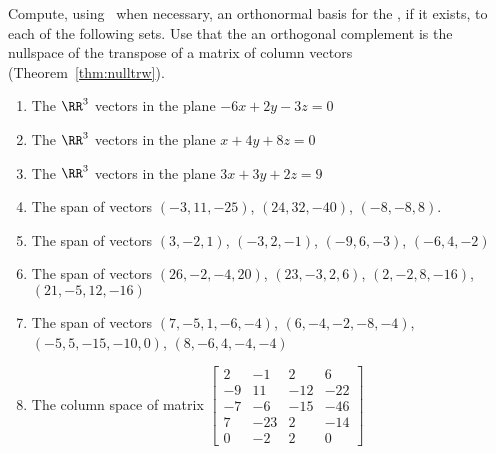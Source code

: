 \begin{exercise} \label{ex:} 
Compute, using \script\ when necessary, an orthonormal basis for the , if it exists, to each of the following sets.
Use that the an orthogonal complement is the nullspace of the transpose of a matrix of column vectors (Theorem~\ref{thm:nulltrw}).

\sloppy%
\begin{enumerate}
\item The \(\RR^3\) vectors in the plane \(-6x+2y-3z=0\)

\item The \(\RR^3\) vectors in the plane \(x+4y+8z=0\)

\item The \(\RR^3\) vectors in the plane \(3x+3y+2z=9\)


\item The span of vectors \((-3,11,-25)\), \((24,32,-40)\), \((-8,-8,8)\).

\item The span of vectors \((3,-2,1)\), \((-3,2,-1)\), \((-9,6,-3)\), \((-6,4,-2)\)

\item The span of vectors \((26,-2,-4,20)\), \((23,-3,2,6)\), \((2,-2,8,-16)\), \((21,-5,12,-16)\)

\item The span of vectors \((7,-5,1,-6,-4)\), \((6,-4,-2,-8,-4)\), \((-5,5,-15,-10,0)\), \((8,-6,4,-4,-4)\)

\item The column space of matrix
\(\begin{bmatrix} 2&-1&2&6
\\-9&11&-12&-22
\\-7&-6&-15&-46
\\7&-23&2&-14
\\0&-2&2&0 \end{bmatrix}\)



\end{enumerate}
\end{exercise}
